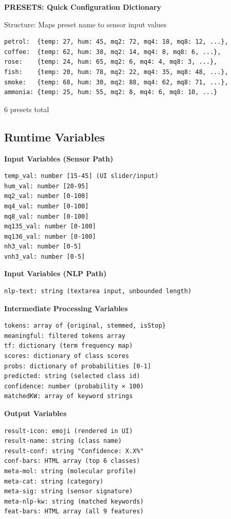 \documentclass[12pt,a4paper]{article}
\begin{document}
\textbf{PRESETS: Quick Configuration Dictionary}

Structure: Maps preset name to sensor input values

\begin{verbatim}
petrol:  {temp: 27, hum: 45, mq2: 72, mq4: 18, mq8: 12, ...},
coffee:  {temp: 62, hum: 38, mq2: 14, mq4: 8, mq8: 6, ...},
rose:    {temp: 24, hum: 65, mq2: 6, mq4: 4, mq8: 3, ...},
fish:    {temp: 20, hum: 78, mq2: 22, mq4: 35, mq8: 48, ...},
smoke:   {temp: 68, hum: 30, mq2: 88, mq4: 62, mq8: 71, ...},
ammonia: {temp: 25, hum: 55, mq2: 8, mq4: 6, mq8: 10, ...}
\end{verbatim}

6 presets total

\subsection{Runtime Variables}

\textbf{Input Variables (Sensor Path)}

\begin{verbatim}
temp_val: number [15-45] (UI slider/input)
hum_val: number [20-95]
mq2_val: number [0-100]
mq4_val: number [0-100]
mq8_val: number [0-100]
mq135_val: number [0-100]
mq136_val: number [0-100]
nh3_val: number [0-5]
vnh3_val: number [0-5]
\end{verbatim}

\textbf{Input Variables (NLP Path)}

\begin{verbatim}
nlp-text: string (textarea input, unbounded length)
\end{verbatim}

\textbf{Intermediate Processing Variables}

\begin{verbatim}
tokens: array of {original, stemmed, isStop}
meaningful: filtered tokens array
tf: dictionary (term frequency map)
scores: dictionary of class scores
probs: dictionary of probabilities [0-1]
predicted: string (selected class id)
confidence: number (probability × 100)
matchedKW: array of keyword strings
\end{verbatim}

\textbf{Output Variables}

\begin{verbatim}
result-icon: emoji (rendered in UI)
result-name: string (class name)
result-conf: string "Confidence: X.X%"
conf-bars: HTML array (top 6 classes)
meta-mol: string (molecular profile)
meta-cat: string (category)
meta-sig: string (sensor signature)
meta-nlp-kw: string (matched keywords)
feat-bars: HTML array (all 9 features)
\end{verbatim}
\end{document}
